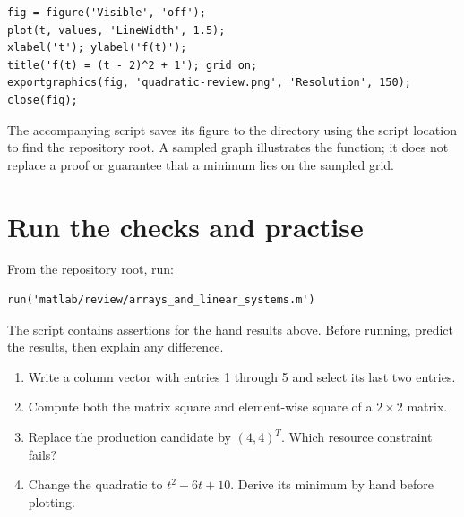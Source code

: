 \documentclass[11pt,a4paper]{article}
\begin{document}
\begin{lstlisting}
fig = figure('Visible', 'off');
plot(t, values, 'LineWidth', 1.5);
xlabel('t'); ylabel('f(t)');
title('f(t) = (t - 2)^2 + 1'); grid on;
exportgraphics(fig, 'quadratic-review.png', 'Resolution', 150);
close(fig);
\end{lstlisting}
The accompanying script saves its figure to the 
directory using the script location to find the repository root.
A sampled graph illustrates the function; it does not replace a proof or guarantee
that a minimum lies on the sampled grid.

\section{Run the checks and practise}\label{sec:practice}
From the repository root, run:
\begin{lstlisting}
run('matlab/review/arrays_and_linear_systems.m')
\end{lstlisting}
The script contains assertions for the hand results above. Before running, predict the results, then explain any difference.
\begin{enumerate}[leftmargin=1.8em]
  \item Write a column vector with entries 1 through 5 and select its last two entries.
  \item Compute both the matrix square and element-wise square of a $2\times2$ matrix.
  \item Replace the production candidate by $(4,4)^T$. Which resource constraint fails?
  \item Change the quadratic to $t^2-6t+10$. Derive its minimum by hand before plotting.
\end{enumerate}
\end{document}
